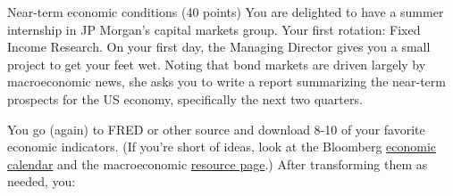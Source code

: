 \documentclass[12pt]{exam}
\begin{document}
\begin{questions}
\begin{solution}
\end{solution}

\question Near-term economic conditions (40 points)
You are delighted to have a summer internship in JP Morgan's
capital markets group.
Your first rotation:  Fixed Income Research.
On your first day, the Managing Director gives you
a small project to get your feet wet.
Noting that bond markets are driven largely by macroeconomic news,
she asks you to write a report summarizing the near-term prospects for the US
economy, specifically the next two quarters.

You go (again) to FRED or other source
and download 8-10 of your favorite economic indicators.
(If you're short of ideas, look at the Bloomberg
\href{http://www.bloomberg.com/markets/economic-calendar/}{economic calendar}
and the macroeconomic
\href{http://pages.stern.nyu.edu/~dbackus/macro_resources.htm}{resource page}.)
After transforming them as needed,
you:
%
\begin{parts}

\end{parts}
\end{questions}
\end{document}
